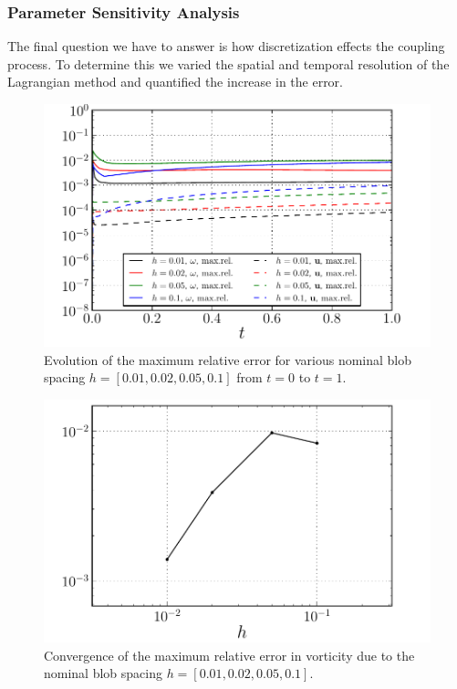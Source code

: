 \subsubsection{Parameter Sensitivity Analysis}
\label{subsubsec:psa}

The final question we have to answer is how discretization effects the coupling process. To determine this we varied the spatial and temporal resolution of the Lagrangian method and quantified the increase in the error. 

	\begin{figure}[!b]
	\centering
	\includegraphics[width=0.6\linewidth]{./figures/validation/lambOseen/lambOseen_parameter_h.pdf}
	\caption{Evolution of the maximum relative error for various nominal blob spacing $h = [0.01,0.02,0.05,0.1]$ from $t=0$ to $t=1$.} %
	\label{fig:lambOseen_parameter_h}
	\end{figure}

	\begin{figure}[!p]
	\centering
	\includegraphics[width=0.6\linewidth]{./figures/validation/lambOseen/lambOseen_parameter_h_Trend.pdf}
	\caption{Convergence of the maximum relative error in vorticity due to the nominal blob spacing $h = [0.01,0.02,0.05,0.1]$.}
	\label{fig:lambOseen_parameter_h_Trend}
	\end{figure}
	
